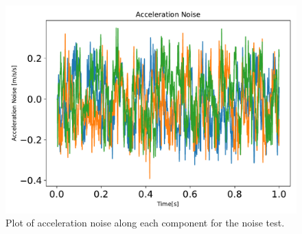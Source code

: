 \begin{figure}[htbp]\centerline{\includegraphics[height=0.7\textwidth, keepaspectratio]{AutoTeX/AccelNoise}}\caption{Plot of acceleration noise along each component for the noise test.}\label{fig:AccelNoise}\end{figure}